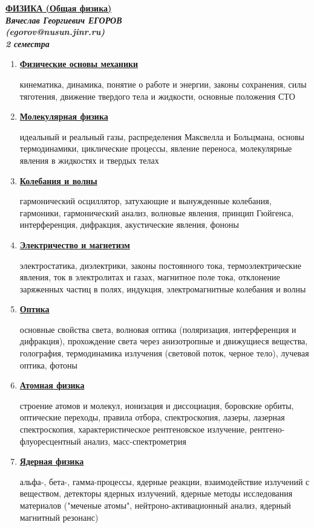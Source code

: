 \documentclass[12pt,epsfig,color,russian]{article}
\begin{document}
\begin{center}
\huge\bf \underline{ФИЗИКА (Общая физика)}\\[5mm]
\Large\sl Вячеслав Георгиевич ЕГОРОВ\\
{\color{blue}(egorov@nusun.jinr.ru)}\\[10mm]
\sf\LARGE
2 семестра
\end{center}
\sf\LARGE
\begin{enumerate}
\item{\underline{\bf Физические основы механики}}

кинематика, динамика, понятие о работе и энергии, законы сохранения, силы тяготения, движение твердого тела и жид\-кости, основные положения СТО
\item{\underline{\bf Молекулярная физика}}

идеальный и реальный газы, распределения Максвелла и Больцмана, основы термодинамики, циклические процес\-сы, явление переноса, молекулярные явления в жидкостях и твердых телах


\item{\underline{\bf Колебания и волны}}

гармонический осциллятор, затухающие и вынужденные ко\-лебания, гармоники, гармонический анализ, волновые явле\-ния, принцип Гюйгенса, интерференция, дифракция, аку\-стические явления, фононы
\item{\underline{\bf	Электричество и магнетизм}}

электростатика, диэлектрики, законы постоянного тока, тер\-моэлектрические явления, ток в электролитах и газах, маг\-нитное поле тока, отклонение заряженных частиц в полях, индукция, электромагнитные колебания и волны

\newpage
\item{\underline{\bf	Оптика}}

основные свойства света, волновая оптика (поляризация, интерференция и дифракция), прохождение света через ан\-изотропные и движущиеся вещества, голография, термоди\-намика излучения (световой поток, черное тело), лучевая оптика, фотоны

\item{\underline{\bf	Атомная физика}}

строение атомов и молекул, ионизация и диссоциация, боро\-вские орбиты, оптические переходы, правила отбора, спек\-троскопия, лазеры, лазерная спектроскопия, характеристи\-ческое рентгеновское излучение, рентгено-флуоресцентный анализ, масс-спектрометрия

\item{\underline{\bf	Ядерная физика}}

альфа-, бета-, гамма-процессы, ядерные реакции, взаимо\-действие излучений с веществом, детекторы ядерных излу\-чений, ядерные методы исследования материалов ("мече\-ные атомы", нейтроно-активационный анализ, ядерный ма\-гнитный резонанс)

\end{enumerate}
\end{document}
